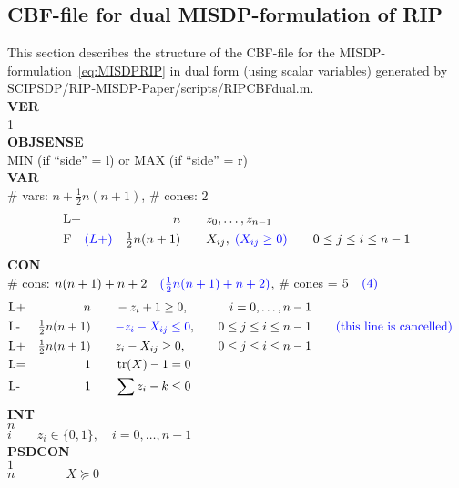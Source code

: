 \documentclass[11pt,a4paper]{article}
\DeclareMathOperator{\tr}{tr}
\theoremstyle{definition}
\begin{document}
\subsection{CBF-file for dual MISDP-formulation of RIP}
\label{sec:CBFdual}
This section describes the structure of the CBF-file for the
MISDP-formulation~\eqref{eq:MISDPRIP} in dual form (using scalar variables)
generated by
\textsf{SCIPSDP/RIP-MISDP-Paper/scripts/RIPCBFdual.m}.\\


{\footnotesize
\noindent
\textbf{VER} \\
1 \\
\textbf{OBJSENSE} \\
MIN (if ``side'' = l) \; or \; MAX (if ``side'' = r) \\
\textbf{VAR} \\
\# vars:  $n+\tfrac{1}{2}n(n+1)$, \qquad \# cones: $2$ \\
\[
  \begin{aligned}
    &\text{L+} &n \qquad & z_0,\dots,z_{n-1} \\
    &\text{F}\quad{\color{blue} (L+)}  &\tfrac{1}{2}n(n+1) \qquad & X_{ij},\;
    {\color{blue} (X_{ij} \geq 0)} \qquad 0 \leq j \leq i \leq n-1
  \end{aligned}
\]
\textbf{CON} \\
\# cons: $n(n+1)+n+2 \quad {\color{blue}(\tfrac{1}{2}n(n+1)+n+2)}$, \qquad
\# cones = $5 \quad {\color{blue} (4)}$\\
\[
  \begin{aligned}
    &\text{L+} &n \qquad & -z_i + 1 \geq 0, \quad & i = 0,\dots,n-1 \\
    &\text{L-} &\tfrac{1}{2}n(n+1) \qquad & {\color{blue}-z_i - X_{ij} \leq 0},\quad & 0
    \leq j \leq i \leq n-1 &\qquad {\color{blue} \text{(this line is cancelled)}}\\
    &\text{L+} &\tfrac{1}{2}n(n+1) \qquad & z_i - X_{ij} \geq 0,\quad & 0
    \leq j \leq i \leq n-1 \\
    &\text{L=}  &1 \qquad & \tr(X) - 1 = 0 \\
    &\text{L-}  &1 \qquad & \sum z_i - k \leq 0
  \end{aligned}
\]
\textbf{INT} \\
$n$ \\
$i \qquad z_i \in \{0,1\}, \quad i = 0,\dots,n-1$ \\
\textbf{PSDCON} \\
$1$  \\
$n \qquad \qquad X \succeq 0$ \\
}
\end{document}
